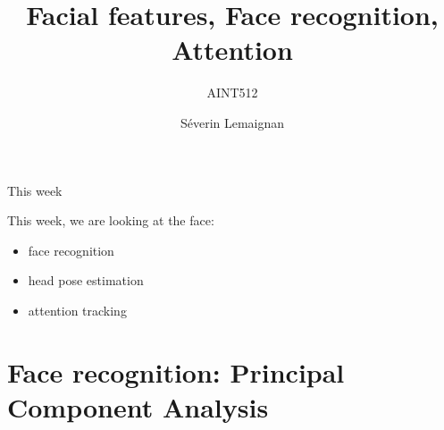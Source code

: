 \documentclass[compress]{beamer}
\title{Facial features, Face recognition, Attention}
\subtitle{AINT512}
\date{}
\author{Séverin Lemaignan}
\institute{Centre for Neural Systems and Robotics\\{\bf Plymouth University}}
\makeatletter
\let\beamer@writeslidentry@miniframeson=\beamer@writeslidentry
\def\beamer@writeslidentry@miniframesoff{%
  \expandafter\beamer@ifempty\expandafter{\beamer@framestartpage}{}%
  {%
    \clearpage\beamer@notesactions%
  }
}
\newcommand*{\miniframeson}{\let\beamer@writeslidentry=\beamer@writeslidentry@miniframeson}
\newcommand*{\miniframesoff}{\let\beamer@writeslidentry=\beamer@writeslidentry@miniframesoff}
\makeatother
\begin{document}
\miniframesoff


\maketitle


\begin{frame}{This week}

This week, we are looking at the face:

    \begin{itemize}
        \item face recognition
        \item head pose estimation
        \item attention tracking
    \end{itemize}
\end{frame}

\miniframeson


\section[Principal Component Analysis]{Face recognition: Principal Component Analysis}

\end{document}
